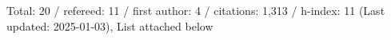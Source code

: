 Total: 20 / refereed: 11 / first author: 4 / citations: 1,313 / h-index: 11 (Last updated: 2025-01-03), List attached below